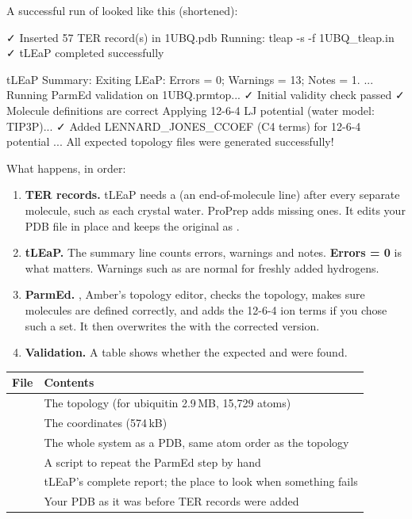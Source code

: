 A successful run of  looked like this (shortened):

\begin{screen}
✓ Inserted 57 TER record(s) in 1UBQ.pdb
Running: tleap -s -f 1UBQ_tleap.in
✓ tLEaP completed successfully

tLEaP Summary: Exiting LEaP: Errors = 0; Warnings = 13; Notes = 1.
...
Running ParmEd validation on 1UBQ.prmtop...
  ✓ Initial validity check passed
  ✓ Molecule definitions are correct
  Applying 12-6-4 LJ potential (water model: TIP3P)...
  ✓ Added LENNARD_JONES_CCOEF (C4 terms) for 12-6-4 potential
...
All expected topology files were generated successfully!
\end{screen}

What happens, in order:

\begin{enumerate}
  \item \textbf{TER records.} tLEaP needs a  (an
        end-of-molecule line) after every separate molecule, such as each
        crystal water. ProPrep adds missing ones. It edits your PDB file in
        place and keeps the original as .
  \item \textbf{tLEaP.} The summary line counts errors, warnings and notes.
        \textbf{Errors = 0} is what matters. Warnings such as  are normal
        for freshly added hydrogens.
  \item \textbf{ParmEd.} , Amber's topology editor, checks the
        topology, makes sure molecules are defined correctly, and adds the
        12-6-4 ion terms if you chose such a set. It then overwrites the
         with the corrected version.
  \item \textbf{Validation.} A table shows whether the expected
         and  were found.
\end{enumerate}

\begin{tabularx}{\linewidth}{@{}lL@{}}
\toprule
\textbf{File} & \textbf{Contents} \\
\midrule
{} & The topology (for ubiquitin 2.9\,MB, 15,729 atoms) \\
 & The coordinates (574\,kB) \\
 & The whole system as a PDB, same atom order as the topology \\
 & A script to repeat the ParmEd step by hand \\
 & tLEaP's complete report; the place to look when something fails \\
 & Your PDB as it was before TER records were added \\
\bottomrule
\end{tabularx}

